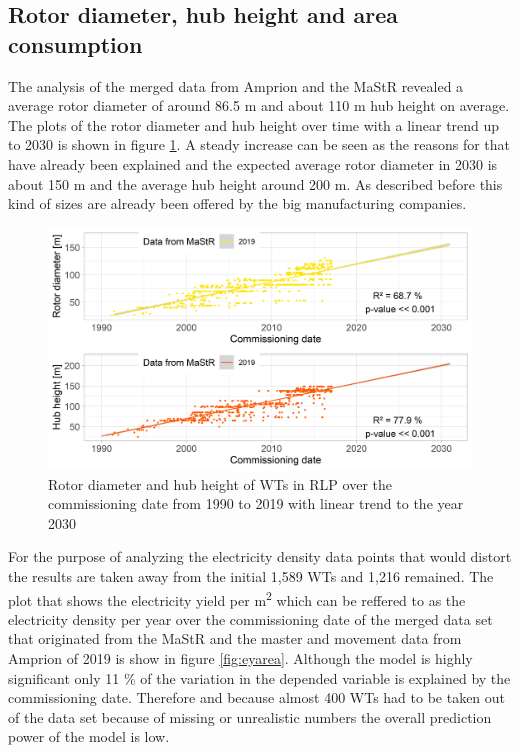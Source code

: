 \documentclass[a4paper,11pt]{article}
\begin{document}
\newpage

\hypertarget{rotor-diameter-hub-height-and-area-consumption}{%
\subsection{Rotor diameter, hub height and area consumption}\label{rotor-diameter-hub-height-and-area-consumption}}

The analysis of the merged data from Amprion and the MaStR revealed a average rotor diameter of around 86.5 m and about 110 m hub height on average. The plots of the rotor diameter and hub height over time with a linear trend up to 2030 is shown in figure \ref{fig:rotorhub}. A steady increase can be seen as the reasons for that have already been explained and the expected average rotor diameter in 2030 is about 150 m and the average hub height around 200 m. As described before this kind of sizes are already been offered by the big manufacturing companies.
\begin{figure}[H]

{\centering \includegraphics[width=1\linewidth]{data/MaStR_amprion_analysis/results_of_analysis/rotor_diameter_hub_height} 

}

\caption{Rotor diameter and hub height of WTs in RLP over the commissioning date from 1990 to 2019 with linear trend to the year 2030}\label{fig:rotorhub}
\end{figure}
For the purpose of analyzing the electricity density data points that would distort the results are taken away from the initial 1,589 WTs and 1,216 remained. The plot that shows the electricity yield per m\textsuperscript{2} which can be reffered to as the electricity density per year over the commissioning date of the merged data set that originated from the MaStR and the master and movement data from Amprion of 2019 is show in figure \ref{fig:eyarea}. Although the model is highly significant only 11 \% of the variation in the depended variable is explained by the commissioning date. Therefore and because almost 400 WTs had to be taken out of the data set because of missing or unrealistic numbers the overall prediction power of the model is low.
\end{document}
